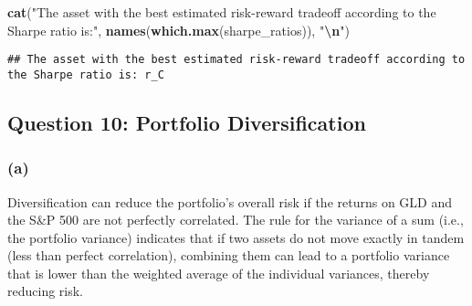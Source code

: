 \documentclass[
]{article}
\newenvironment{Shaded}{\begin{snugshade}}{\end{snugshade}}
\newcommand{\FunctionTok}[1]{\textcolor[rgb]{0.13,0.29,0.53}{\textbf{#1}}}
\newcommand{\NormalTok}[1]{#1}
\newcommand{\SpecialCharTok}[1]{\textcolor[rgb]{0.81,0.36,0.00}{\textbf{#1}}}
\newcommand{\StringTok}[1]{\textcolor[rgb]{0.31,0.60,0.02}{#1}}
\begin{document}
\begin{Shaded}
\begin{Highlighting}[]
\FunctionTok{cat}\NormalTok{(}\StringTok{"The asset with the best estimated risk{-}reward tradeoff according to the Sharpe ratio is:"}\NormalTok{, }\FunctionTok{names}\NormalTok{(}\FunctionTok{which.max}\NormalTok{(sharpe\_ratios)), }\StringTok{"}\SpecialCharTok{\textbackslash{}n}\StringTok{"}\NormalTok{)}
\end{Highlighting}
\end{Shaded}

\begin{verbatim}
## The asset with the best estimated risk-reward tradeoff according to the Sharpe ratio is: r_C
\end{verbatim}

\hypertarget{question-10-portfolio-diversification}{%
\subsection{Question 10: Portfolio
Diversification}\label{question-10-portfolio-diversification}}

\hypertarget{a}{%
\subsubsection{(a)}\label{a}}

Diversification can reduce the portfolio's overall risk if the returns
on GLD and the S\&P 500 are not perfectly correlated. The rule for the
variance of a sum (i.e., the portfolio variance) indicates that if two
assets do not move exactly in tandem (less than perfect correlation),
combining them can lead to a portfolio variance that is lower than the
weighted average of the individual variances, thereby reducing risk.
\end{document}
